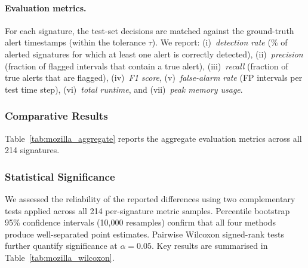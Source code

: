 \documentclass[pdflatex,sn-nature]{sn-jnl}%
\theoremstyle{thmstyleone}%
\theoremstyle{thmstyletwo}%
\theoremstyle{thmstylethree}%
\begin{document}
\paragraph{Evaluation metrics.}
For each signature, the test-set decisions are matched against the ground-truth alert timestamps (within the tolerance $\tau$). We report: (i)~\textit{detection rate} (\% of alerted signatures for which at least one alert is correctly detected), (ii)~\textit{precision} (fraction of flagged intervals that contain a true alert), (iii)~\textit{recall} (fraction of true alerts that are flagged), (iv)~\textit{F1 score}, (v)~\textit{false-alarm rate} (FP intervals per test time step), (vi)~\textit{total runtime}, and (vii)~\textit{peak memory usage}.

\subsubsection{Comparative Results}
Table~\ref{tab:mozilla_aggregate} reports the aggregate evaluation metrics across all 214 signatures.

\begin{table}[tbp]
\centering
{}
\caption{Aggregate evaluation results across 214 Mozilla Firefox-Android signatures. FAR = false-alarm rate. Bold indicates the best value per column.}
\label{tab:mozilla_aggregate}
\end{table}

\subsubsection{Statistical Significance}
We assessed the reliability of the reported differences using two complementary tests applied across all 214 per-signature metric samples. Percentile bootstrap 95\% confidence intervals (10{,}000 resamples) confirm that all four methods produce well-separated point estimates. Pairwise Wilcoxon signed-rank tests further quantify significance at $\alpha = 0.05$. Key results are summarised in Table~\ref{tab:mozilla_wilcoxon}.
\end{document}
